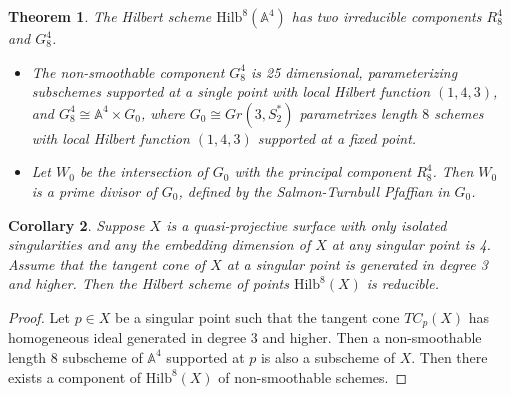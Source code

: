\documentclass{amsart}[12pt]
\newtheorem{theorem}{Theorem}[section]
\newtheorem{cor}[theorem]{Corollary}
\theoremstyle{definition}
\theoremstyle{remark}
\numberwithin{equation}{section}
\begin{document}
\begin{theorem} The Hilbert scheme $\mathrm{Hilb}^8(\mathbb{A}^4)$ has two irreducible components $R_8^4$ and $G_8^4$.
\begin{itemize}
\item[(1)] The non-smoothable component $G_8^4$ is 25 dimensional, parameterizing subschemes supported at a single point with local Hilbert function $(1, 4, 3)$, and $G_8^4 \cong \mathbb{A}^4 \times G_0$, where $G_0 \cong Gr(3, S_2^*)$ parametrizes length $8$ schemes with local Hilbert function $(1, 4, 3)$ supported at a fixed point.
\item[(2)] Let $W_0$ be the intersection of $G_0$ with the principal component $R_8^4$. Then $W_0$ is a prime divisor of $G_0$, defined by the Salmon-Turnbull Pfaffian in $G_0$.
\end{itemize}
\end{theorem}

\begin{cor}
Suppose $X$ is a quasi-projective surface with only isolated singularities and any the embedding dimension of $X$ at any singular point is 4. Assume that the tangent cone of $X$ at a singular point is generated in degree 3 and higher. Then the Hilbert scheme of points $\mathrm{Hilb}^8(X)$ is reducible. 
\end{cor}
\begin{proof}
Let $p \in X$ be a singular point such that the tangent cone $TC_p(X)$ has homogeneous ideal generated in degree 3 and higher. Then a non-smoothable length 8 subscheme of $\mathbb{A}^4$ supported at $p$ is also a subscheme of $X$. Then there exists a component of $\mathrm{Hilb}^8(X)$ of non-smoothable schemes. 
\end{proof}
\end{document}
